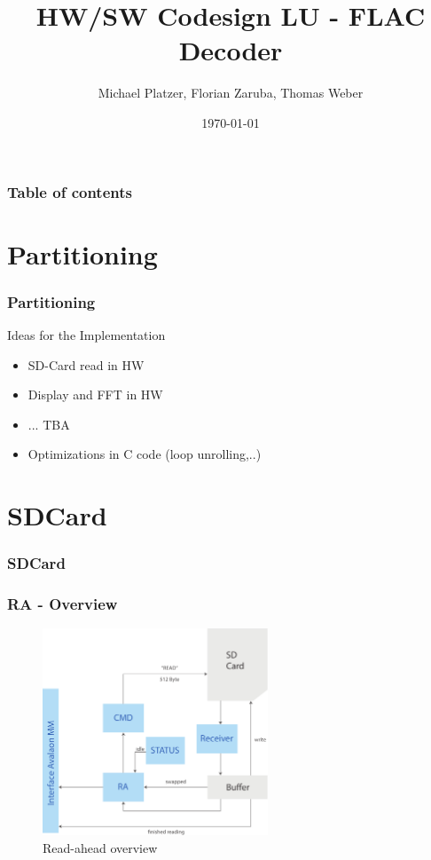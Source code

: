 \documentclass{beamer}
\begin{document}
\title[Entwurssprachen]{HW/SW Codesign LU - FLAC Decoder}
\author[Platzer M., Zaruba F., Weber T.]{Michael Platzer, Florian Zaruba, Thomas Weber}
\date{\today}

\begin{frame}
\titlepage
\end{frame}

\begin{frame}\frametitle{Table of contents}
  \tableofcontents
\end{frame}

\section{Partitioning} 
\begin{frame}\frametitle{Partitioning} 
Ideas for the Implementation
\begin{itemize}
	\item SD-Card read in HW
	\item Display and FFT in HW
	\item ... TBA
	\item Optimizations in C code (loop unrolling,..)
\end{itemize}
\end{frame}

\section{SDCard}
\begin{frame}\frametitle{SDCard}
	
\end{frame}
\begin{frame}\frametitle{RA - Overview}
    \begin{figure}[hp]
      \centering
      \includegraphics[width=0.6\textwidth]{pictures/read_ahead_overview}
      \caption{Read-ahead overview}
      \label{fig:fft_display_struct}
    \end{figure}
\end{frame}
\end{document}

